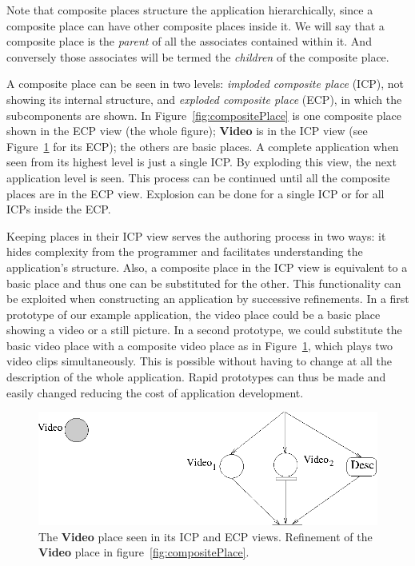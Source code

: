 \documentclass[twocolumn,10pt]{article}
\newcommand{\elmt}[1]{{\bf #1}}
\begin{document}


Note that composite places structure the application hierarchically,
since a composite place can have other composite places inside it.  We
will say that a composite place is the {\em parent} of all the
associates contained within it.  And conversely those associates will
be termed the {\em children} of the composite place.

A composite place can be seen in two levels: {\em imploded composite
place} (ICP), not showing its internal structure, and {\em exploded
composite place} (ECP), in which the subcomponents are shown.  In
Figure~\ref{fig:compositePlace} is one composite place shown in
the ECP view (the whole figure);  \elmt{Video} is in the ICP view (see
Figure~\ref{fig:refinement} for its ECP); the others are basic places.  A
complete application when seen from its highest level is just a single
ICP.  By exploding this view, the next application level is seen.
This process can be continued until all the composite places are in
the ECP view.  Explosion can be done for a single ICP or for all ICPs
inside the ECP.

Keeping places in their ICP view serves the authoring process in two
ways: it hides complexity from the programmer and facilitates
understanding the application's structure.  Also, a composite place in
the ICP view is equivalent to a basic place and thus one can be
substituted for the other.  This functionality can be exploited when
constructing an application by successive refinements.  In a first
prototype of our example application, the video place could be a basic
place showing a video or a still picture.  In a second prototype, we
could substitute the basic video place with a composite video place as
in Figure~\ref{fig:refinement}, which plays two video clips
simultaneously.  This is possible without having to change at all the
description of the whole application.  Rapid prototypes can thus be
made and easily changed reducing the cost of application development.


\begin{figure}[bt]
    \centering
    \includegraphics[width=0.4\textheight]{figures/refinement.eps}%
    \caption{The \elmt{Video} place seen in its ICP and ECP views.
            Refinement of the \elmt{Video} place in
            figure~\ref{fig:compositePlace}.}
    \label{fig:refinement}
\end{figure}
\vspace*{-0.5cm}
\textbf{\textit{}}
\end{document}
